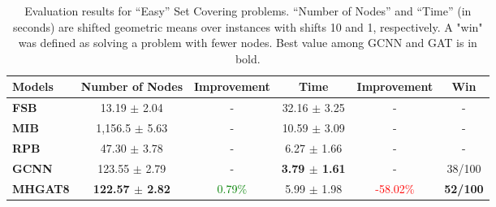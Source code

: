\begin{table*}[htb!]
    \centering
    \begin{tabular}{|l c c c c c|}
        \hline
        \textbf{Models} & \textbf{Number of Nodes} & \textbf{Improvement} & \textbf{Time} & \textbf{Improvement} & \textbf{Win}\\
        \hline
        \textbf{FSB} & 13.19 $\pm$ 2.04 & - & 32.16 $\pm$ 3.25 & - & -\\
        \textbf{MIB} & 1,156.5 $\pm$ 5.63 & - & 10.59 $\pm$ 3.09 & - & -\\
        \textbf{RPB} & 47.30 $\pm$ 3.78 & - & 6.27 $\pm$ 1.66 & - & -\\
        \hline
        \textbf{GCNN} & 123.55 $\pm$ 2.79 & - & \textbf{3.79 $\pm$ 1.61} & - & 38/100\\
        \textbf{MHGAT8} & \textbf{122.57 $\pm$ 2.82} & \textcolor{green}{0.79\%} & 5.99 $\pm$ 1.98 & \textcolor{red}{-58.02\%} & \textbf{52/100}\\
        \hline
    \end{tabular}
    \caption{Evaluation results for “Easy” Set Covering problems. “Number of Nodes” and “Time” (in seconds) are shifted geometric means over instances with shifts 10 and 1, respectively.
    A "win" was defined as solving a problem with fewer nodes.
    Best value among GCNN and GAT is in bold.}
    \label{tab:sc-results-easy}
\end{table*}